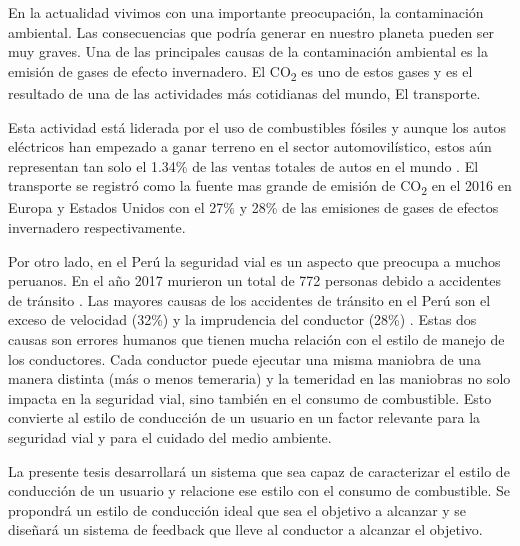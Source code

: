 \begin{introduction}

En la actualidad vivimos con una importante preocupación, la contaminación ambiental. Las consecuencias que podría generar en nuestro planeta pueden ser muy graves. Una de las principales causas de la contaminación ambiental es la emisión de gases de efecto invernadero. El CO\textsubscript{2} es uno de estos gases y es el resultado de una de las actividades más cotidianas del mundo, El transporte.

Esta actividad está liderada por el uso de combustibles fósiles y aunque los autos eléctricos han empezado a ganar terreno en el sector automovilístico, estos aún representan tan solo el 1.34\% de las ventas totales de autos en el mundo \cite{website:EV-sales}. El transporte se registró como la fuente mas grande de emisión de CO\textsubscript{2} en el 2016 en Europa y Estados Unidos con el 27\% y 28\% de las emisiones de gases de efectos invernadero respectivamente.

Por otro lado, en el Perú la seguridad vial es un aspecto que preocupa a muchos peruanos. En el año 2017 murieron un total de 772 personas debido a accidentes de tránsito \cite{website:El-comercio}. Las mayores causas de los accidentes de tránsito en el Perú son el exceso de velocidad (32\%) y la imprudencia del conductor (28\%) \cite{website:PNP-accidentes}. Estas dos causas son errores humanos que tienen mucha relación con el estilo de manejo de los conductores. Cada conductor puede ejecutar una misma maniobra de una manera distinta (más o menos temeraria) y la temeridad en las maniobras no solo impacta en la seguridad vial, sino también en el consumo de combustible. Esto convierte al estilo de conducción de un usuario en un factor relevante para la seguridad vial y para el cuidado del medio ambiente.

La presente tesis desarrollará un sistema que sea capaz de caracterizar el estilo de conducción de un usuario y  relacione ese estilo con el consumo de combustible. Se propondrá un estilo de conducción ideal que sea el objetivo a alcanzar y se diseñará un sistema de feedback que lleve al conductor a alcanzar el objetivo.


\end{introduction}
